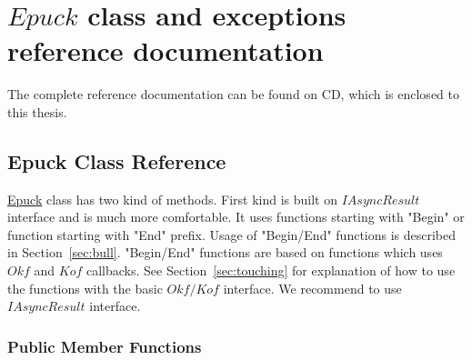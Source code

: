 \chapter{$Epuck$ class and exceptions reference documentation} \label{app:epuckref}
\begin{remark}
The complete reference documentation can be found on CD, which is enclosed
to this thesis.
\end{remark}
\hypertarget{class_elib_1_1_epuck}{
\section{Epuck Class Reference}
\label{class_elib_1_1_epuck}
}
\hyperlink{class_elib_1_1_epuck}{Epuck} class has two kind of methods.
First kind is built on $IAsyncResult$ interface and is much more comfortable.
It uses functions starting with "Begin" or function starting with "End" prefix.
Usage of "Begin/End" functions is described in Section~\ref{sec:bull}.
"Begin/End" functions are based on functions which uses $Okf$ and $Kof$ callbacks.
See Section~\ref{sec:touching} for explanation of how to use the functions with
the basic $Okf/Kof$ interface.
We recommend to use $IAsyncResult$ interface.

\subsection*{Public Member Functions}

